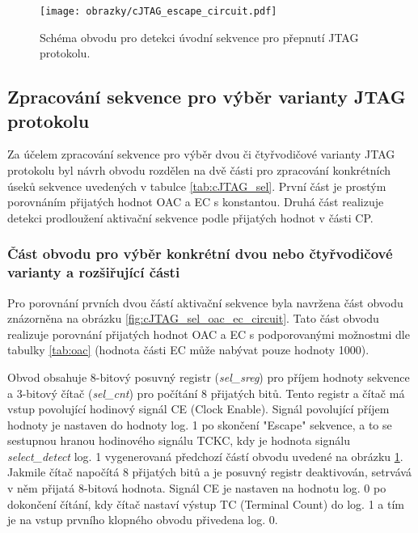 \begin{figure}[!h]
  \begin{center}
    \texttt{[image: obrazky/cJTAG\_escape\_circuit.pdf]}
  \end{center}
  \caption{Schéma obvodu pro detekci úvodní sekvence pro přepnutí \acs{JTAG} protokolu.}
	\label{fig:cJTAG_escape_circuit}
\end{figure}

\subsection{Zpracování sekvence pro výběr varianty \acs{JTAG} protokolu}	\label{subsec:sel_seq_det}
Za účelem zpracování sekvence pro výběr dvou či čtyřvodičové varianty \acs{JTAG} protokolu byl návrh obvodu rozdělen na dvě části pro zpracování konkrétních úseků sekvence uvedených v tabulce \ref{tab:cJTAG_sel}. První část je prostým porovnáním přijatých hodnot \acs{OAC} a \acs{EC} s konstantou. Druhá část realizuje detekci prodloužení aktivační sekvence podle přijatých hodnot v části \acs{CP}.

\subsubsection{Část obvodu pro výběr konkrétní dvou nebo čtyřvodičové varianty a rozšiřující části}
Pro porovnání prvních dvou částí aktivační sekvence byla navržena část obvodu znázorněna na obrázku \ref{fig:cJTAG_sel_oac_ec_circuit}. Tato část obvodu realizuje porovnání přijatých hodnot \acs{OAC} a \acs{EC} s podporovanými možnostmi dle tabulky \ref{tab:oac} (hodnota části \acs{EC} může nabývat pouze hodnoty 1000).

Obvod obsahuje 8-bitový posuvný registr (\textit{sel\_sreg}) pro příjem hodnoty sekvence a 3-bitový čítač (\textit{sel\_cnt}) pro počítání 8 přijatých bitů. Tento registr a čítač má vstup povolující hodinový signál CE (Clock Enable). Signál povolující příjem hodnoty je nastaven do hodnoty log. 1 po skončení "Escape" sekvence, a to se sestupnou hranou hodinového signálu \acs{TCKC}, kdy je hodnota signálu \textit{select\_detect} log. 1 vygenerovaná předchozí částí obvodu uvedené na obrázku \ref{fig:cJTAG_escape_circuit}. Jakmile čítač napočítá 8 přijatých bitů a je posuvný registr deaktivován, setrvává v něm přijatá 8-bitová hodnota. Signál CE je nastaven na hodnotu log. 0 po dokončení čítání, kdy čítač nastaví výstup TC (Terminal Count) do log. 1 a tím je na vstup prvního klopného obvodu přivedena log. 0.


